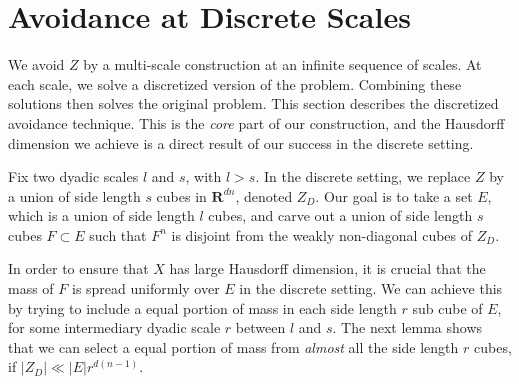 \documentclass[usenames,dvipsnames]{article}
\theoremstyle{plain}
\theoremstyle{plain}
\begin{document}
\section{Avoidance at Discrete Scales}

We avoid $Z$ by a multi-scale construction at an infinite sequence of scales. At each scale, we solve a discretized version of the problem. Combining these solutions then solves the original problem. This section describes the discretized avoidance technique. This is the {\it core} part of our construction, and the Hausdorff dimension we achieve is a direct result of our success in the discrete setting.

Fix two dyadic scales $l$ and $s$, with $l > s$. In the discrete setting, we replace $Z$ by a union of side length $s$ cubes in $\mathbf{R}^{dn}$, denoted $Z_D$. Our goal is to take a set $E$, which is a union of side length $l$ cubes, and carve out a union of side length $s$ cubes $F \subset E$ such that $F^n$ is disjoint from the weakly non-diagonal cubes of $Z_D$.

In order to ensure that $X$ has large Hausdorff dimension, it is crucial that the mass of $F$ is spread uniformly over $E$ in the discrete setting. We can achieve this by trying to include a equal portion of mass in each side length $r$ sub cube of $E$, for some intermediary dyadic scale $r$ between $l$ and $s$. The next lemma shows that we can select a equal portion of mass from {\it almost} all the side length $r$ cubes, if $|Z_D| \ll |E| r^{d(n-1)}$.
\end{document}
